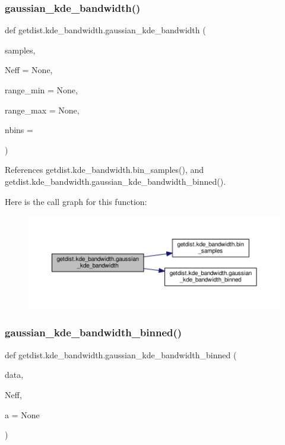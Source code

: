 \subsubsection{\texorpdfstring{gaussian\+\_\+kde\+\_\+bandwidth()}{gaussian\_kde\_bandwidth()}}
{\footnotesize\ttfamily def getdist.\+kde\+\_\+bandwidth.\+gaussian\+\_\+kde\+\_\+bandwidth (\begin{DoxyParamCaption}\item[{}]{samples,  }\item[{}]{Neff = {\ttfamily None},  }\item[{}]{range\+\_\+min = {\ttfamily None},  }\item[{}]{range\+\_\+max = {\ttfamily None},  }\item[{}]{nbins = {} }\end{DoxyParamCaption})}



References getdist.\+kde\+\_\+bandwidth.\+bin\+\_\+samples(), and getdist.\+kde\+\_\+bandwidth.\+gaussian\+\_\+kde\+\_\+bandwidth\+\_\+binned().

Here is the call graph for this function\+:
\nopagebreak
\begin{figure}[H]
\begin{center}
\leavevmode
\includegraphics[width=350pt]{namespacegetdist_1_1kde__bandwidth_a263039d35460dd02a02948f52351bd52_cgraph}
\end{center}
\end{figure}
\mbox{\label{namespacegetdist_1_1kde__bandwidth_a87c7248527d8c44ff87753be76949fde}} 
\subsubsection{\texorpdfstring{gaussian\+\_\+kde\+\_\+bandwidth\+\_\+binned()}{gaussian\_kde\_bandwidth\_binned()}}
{\footnotesize\ttfamily def getdist.\+kde\+\_\+bandwidth.\+gaussian\+\_\+kde\+\_\+bandwidth\+\_\+binned (\begin{DoxyParamCaption}\item[{}]{data,  }\item[{}]{Neff,  }\item[{}]{a = {\ttfamily None} }\end{DoxyParamCaption})}

